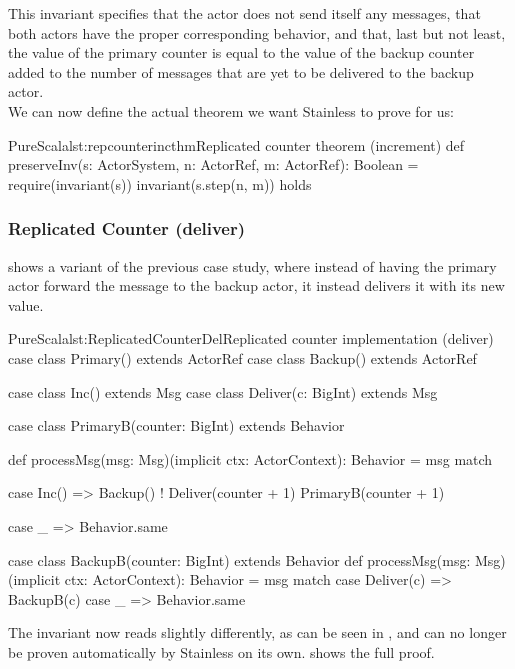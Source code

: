 This invariant specifies that the  actor does not send itself any messages, that both actors have the proper corresponding behavior, and that, last but not least, the value of the primary counter is equal to the value of the backup counter added to the number of messages that are yet to be delivered to the backup actor.\\

We can now define the actual theorem we want Stainless to prove for us:

\begin{Code}{PureScala}{lst:repcounterincthm}{Replicated counter theorem (increment)}
def preserveInv(s: ActorSystem, n: ActorRef, m: ActorRef): Boolean = {
  require(invariant(s))
  invariant(s.step(n, m))
} holds
\end{Code}


\subsubsection*{Replicated Counter (deliver)}

 shows a variant of the previous case study, where instead of having the primary actor forward the  message to the backup actor, it instead delivers it with its new value.

\begin{Code}{PureScala}{lst:ReplicatedCounterDel}{Replicated counter implementation (deliver)}
case class Primary() extends ActorRef
case class Backup()  extends ActorRef

case class Inc() extends Msg
case class Deliver(c: BigInt) extends Msg

case class PrimaryB(counter: BigInt) extends Behavior {
  def processMsg(msg: Msg)(implicit ctx: ActorContext): Behavior = msg match {
    case Inc() =>
      Backup() ! Deliver(counter + 1)
      PrimaryB(counter + 1)

    case _ => Behavior.same
  }
}

case class BackupB(counter: BigInt) extends Behavior {
  def processMsg(msg: Msg)(implicit ctx: ActorContext): Behavior = msg match {
    case Deliver(c) => BackupB(c)
    case _          => Behavior.same
  }
}
\end{Code}

The invariant now reads slightly differently, as can be seen in , and can no longer be proven automatically by Stainless on its own.  shows the full proof.

